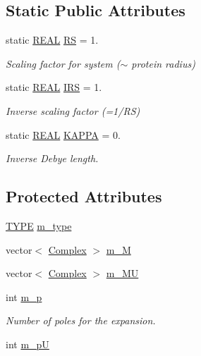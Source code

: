 \subsection*{Static Public Attributes}
\begin{DoxyCompactItemize}
\item 
static \hyperlink{util_8h_a5821460e95a0800cf9f24c38915cbbde}{R\-E\-A\-L} \hyperlink{classCMCoeff_a512caa3ff1994cbde85011489b8f34ce}{R\-S} = 1.
\begin{DoxyCompactList}\small\item\em Scaling factor for system ($\sim$ protein radius) \end{DoxyCompactList}\item 
static \hyperlink{util_8h_a5821460e95a0800cf9f24c38915cbbde}{R\-E\-A\-L} \hyperlink{classCMCoeff_a7e893ff6deb29f85472663fffd995f42}{I\-R\-S} = 1.
\begin{DoxyCompactList}\small\item\em Inverse scaling factor (=1/\-R\-S) \end{DoxyCompactList}\item 
static \hyperlink{util_8h_a5821460e95a0800cf9f24c38915cbbde}{R\-E\-A\-L} \hyperlink{classCMCoeff_a468f6af1ba4ddbe13561217488c87b40}{K\-A\-P\-P\-A} = 0.
\begin{DoxyCompactList}\small\item\em Inverse Debye length. \end{DoxyCompactList}\end{DoxyCompactItemize}
\subsection*{Protected Attributes}
\begin{DoxyCompactItemize}
\item 
\hyperlink{classCMCoeff_a0b490eeb5ba86bc1a95ea1c3b2946478}{T\-Y\-P\-E} \hyperlink{classCMCoeff_afe0cd2c61d33f32a058302fb53c33ccf}{m\-\_\-type}
\item 
vector$<$ \hyperlink{util_8h_a0ef19d29521fc1e3356ea268ba175cfc}{Complex} $>$ \hyperlink{classCMCoeff_a15347641cc66b95ff56bea89f4585edf}{m\-\_\-\-M}
\item 
vector$<$ \hyperlink{util_8h_a0ef19d29521fc1e3356ea268ba175cfc}{Complex} $>$ \hyperlink{classCMCoeff_a2fc4617b2a37d2ca033aea2f5e02b5de}{m\-\_\-\-M\-U}
\item 
int \hyperlink{classCMCoeff_adf49f0bd55b7c496b887f547695aba38}{m\-\_\-p}
\begin{DoxyCompactList}\small\item\em Number of poles for the expansion. \end{DoxyCompactList}\item 
int \hyperlink{classCMCoeff_ac00d5938d669575bf71826ee725ccf46}{m\-\_\-p\-U}
\end{DoxyCompactItemize}
